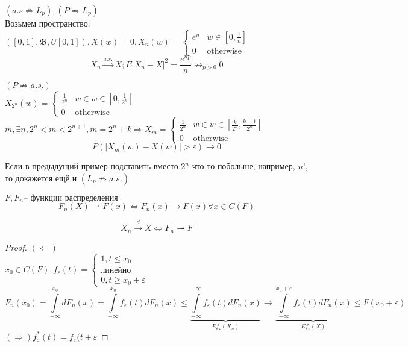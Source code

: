 \documentclass{article}
\newcommand{\B}{{\mathfrak B}}
\begin{document}
    \begin{example}
        $(a.s \not\Rightarrow L_p), (P\not\Rightarrow L_p)$\\
        Возьмем пространство: $([0, 1], \B, U[0, 1]), X(w) =0, X_n(w) = \begin{cases}
            e^n & w \in [0, \frac{1}{n}] \\
            0 & \text{otherwise}
        \end{cases}$
        $$ X_n \xrightarrow{a.s.} X; E|X_n - X|^2 = \frac{e^{np}}{n} \not\to_{p > 0} 0$$
    \end{example}
    \begin{example}
        $(P \not\Rightarrow a.s.)$\\
        $ X_{2^n}(w) = \begin{cases}
            \frac{1}{2^n} & w \in w\in [0, \frac{1}{2^n}]\\
            0 & \text{otherwise}
        \end{cases}$ \\ 
        $m, \exists n, 2^n < m < 2^{n+1}, m = 2^n + k \Rightarrow X_{m} = \begin{cases}
            \frac{1}{2^n} & w \in w\in [\frac{k}{2^n}, \frac{k+1}{2^n}]\\
            0 & \text{otherwise}
        \end{cases} $
        $$ P(|X_m(w) -X(w)| > \varepsilon) \to 0$$
    \end{example}
    \begin{remark}
        Если в предыдущий пример подставить вместо $2^n$ что-то побольше, например, $n!$, то докажется ещё и $(L_p \not\Rightarrow a.s.)$\\
    \end{remark}
    \begin{definition}
        $F, F_n \text{-- функции распределения}$
        $$F_n(X) \rightharpoonup F(x) \Leftrightarrow F_n(x) \to F(x) \forall x \in C(F)$$
    \end{definition}
    \begin{theorem}
        $$X_n \xrightarrow{d} X \Leftrightarrow F_n \rightharpoonup F $$
        \begin{proof}
            $(\Leftarrow)$\\
            $x_0 \in C(F): f_\varepsilon(t) = \begin{cases}
                1, t \le x_0\\
                \text{линейно}\\
                0, t \ge x_0 + \varepsilon
            \end{cases} $\\
            $$F_n(x_0) = \int\limits_{-\infty}^{x_0} dF_n(x) = \int\limits_{-\infty}^{x_0}f_\varepsilon(t) dF_n(x) \le \underbrace{\int\limits_{-\infty}^{+\infty} f_\varepsilon(t) dF_n(x)}_{Ef_\varepsilon(X_n)} \to \underbrace{\int\limits_{-\infty}^{x_0 + \varepsilon} f_\varepsilon(t) dF_n(x)}_{Ef_\varepsilon(X)} \le F(x_0+ \varepsilon) $$
            $(\Rightarrow) f_\varepsilon^*(t) = f_\varepsilon(t+\varepsilon$
        \end{proof}
    \end{theorem}
\end{document}
